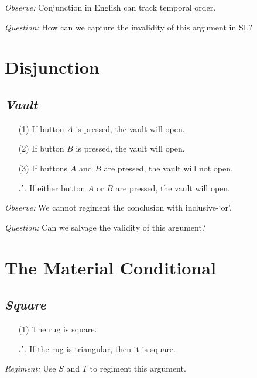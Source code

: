 \documentclass[a4paper, 11pt]{article} %
\def\therefore{\ensuremath{\ldotp\dot{}\,\ldotp}}
\begin{document}
\noindent
\textit{Observe:} Conjunction in English can track temporal order.
\vspace{.05in}

\noindent
\textit{Question:} How can we capture the invalidity of this argument in SL?




\section*{Disjunction}

\subsection*{\it \textbf{Vault}}

\begin{enumerate}
  \item[(1)] If button $A$ is pressed, the vault will open. 
  \item[(2)] If button $B$ is pressed, the vault will open.
  \item[(3)] If buttons $A$ and $B$ are pressed, the vault will not open.
  \item[\therefore] If either button $A$ or $B$ are pressed, the vault will open. 
\end{enumerate}

\noindent
\textit{Observe:} We cannot regiment the conclusion with inclusive-`or'.
\vspace{.05in}

\noindent
\textit{Question:} Can we salvage the validity of this argument?



\section*{The Material Conditional}

\subsection*{\it \textbf{Square}}

\begin{enumerate}
  \item[(1)] The rug is square.
  \item[\therefore] If the rug is triangular, then it is square.
\end{enumerate}

\noindent
\textit{Regiment:} Use $S$ and $T$ to regiment this argument. 
\vspace{.05in}
\end{document}
